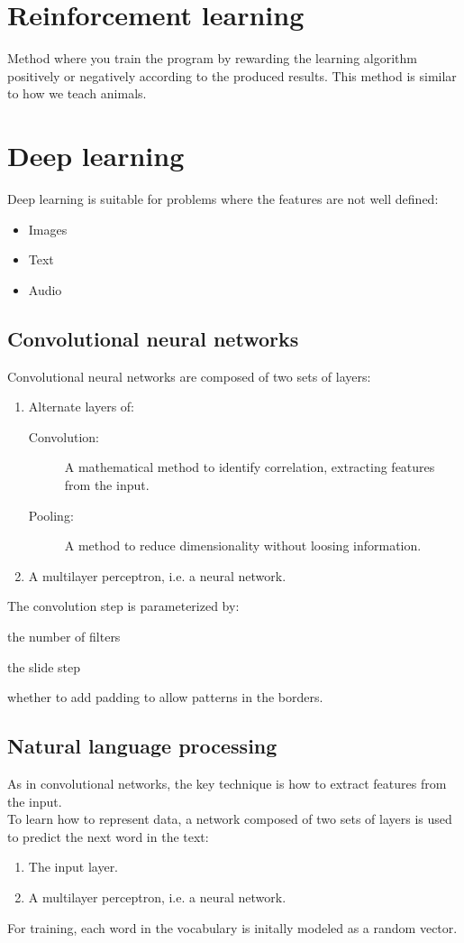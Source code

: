 \documentclass[11pt]{article}
\begin{document}
\section{Reinforcement learning}
\label{sec:org47e131c}
Method where you train the program by rewarding the learning algorithm positively or
negatively according to the produced results. This method is similar to how we teach
animals.
\pagebreak
\section{Deep learning}
\label{sec:orgf814747}
Deep learning is suitable for problems where the features are not well defined:
\begin{itemize}[itemsep=0pt]
\item Images
\item Text
\item Audio
\end{itemize}
\subsection{Convolutional neural networks}
\label{sec:org818d870}
Convolutional neural networks are composed of two sets of layers:
\begin{enumerate}[itemsep=0pt]
\item Alternate layers of:
\begin{description}
\item[{Convolution:}] A mathematical method to identify correlation, extracting features
from the input.
\item[{Pooling:}] A method to reduce dimensionality without loosing information.
\vspace{3pt}
\end{description}
\item A multilayer perceptron, i.e. a neural network.
\end{enumerate}
The convolution step is parameterized by:
\begin{description}[itemsep=0pt]
\item[{Depth:}] the number of filters
\item[{Stride:}] the slide step
\item[{Zero-padding:}] whether to add padding to allow patterns in the borders.
\end{description}
\subsection{Natural language processing}
\label{sec:org6c2dd74}
As in convolutional networks, the key technique is how to extract features from the
input. \\
To learn how to represent data, a network composed of two sets of layers is used to
predict the next word in the text:
\begin{enumerate}[itemsep=0pt]
\item The input layer.
\item A multilayer perceptron, i.e. a neural network.
\end{enumerate}
For training, each word in the vocabulary is initally modeled as a random vector. \\
\end{document}
